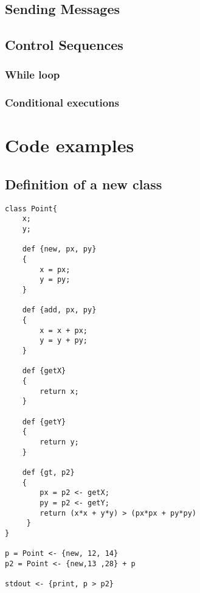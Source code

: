 \documentclass{eplDoc}
\begin{document}
\subsection{Sending Messages}

\subsection{Control Sequences} %

\subsubsection{While loop}

\subsubsection{Conditional executions}

\section{Code examples}

\subsection{Definition of a new class}
\begin{lstlisting}
class Point{
    x;
    y;

    def {new, px, py}
    {
        x = px;
        y = py;
    }

    def {add, px, py}
    {
        x = x + px;
        y = y + py;
    }

    def {getX}
    {
        return x;    
    }
    
    def {getY}
    {
        return y;    
    }

    def {gt, p2}
    {
        px = p2 <- getX;    
        py = p2 <- getY;    
        return (x*x + y*y) > (px*px + py*py)
     }
}

p = Point <- {new, 12, 14}
p2 = Point <- {new,13 ,28} + p

stdout <- {print, p > p2}

\end{lstlisting}
\end{document}
